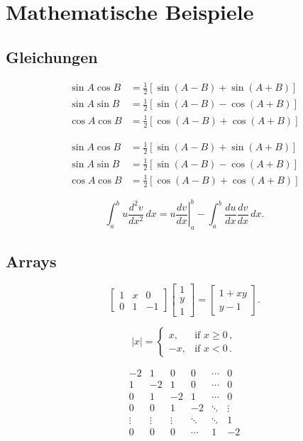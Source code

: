 \chapter{Mathematische Beispiele}
\label{sec:math}


\section{Gleichungen}

\begin{align}
\sin A \cos B &= \frac{1}{2}\left[ \sin(A-B)+\sin(A+B) \right] \\
\sin A \sin B &= \frac{1}{2}\left[ \sin(A-B)-\cos(A+B) \right] \\
\cos A \cos B &= \frac{1}{2}\left[ \cos(A-B)+\cos(A+B) \right] 
\end{align}

\begin{align*}
\sin A \cos B &= \frac{1}{2}\left[ \sin(A-B)+\sin(A+B) \right] \\
\sin A \sin B &= \frac{1}{2}\left[ \sin(A-B)-\cos(A+B) \right] \\
\cos A \cos B &= \frac{1}{2}\left[ \cos(A-B)+\cos(A+B) \right] 
\end{align*}

\[
\int_a^bu\frac{d^2v}{dx^2}\,dx
=\left.u\frac{dv}{dx}\right|_a^b
-\int_a^b\frac{du}{dx}\frac{dv}{dx}\,dx.
\]



\section{Arrays}

\[
\begin{bmatrix}
1 & x & 0 \\
0 & 1 & -1
\end{bmatrix}\begin{bmatrix}
1  \\
y  \\
1
\end{bmatrix}
=\begin{bmatrix}
1+xy  \\
y-1
\end{bmatrix}.
\]


\[
|x|=\begin{cases}
x, & \text{if }x\geq 0\,,  \\
-x, & \text{if }x< 0\,.
\end{cases}
\]


\[
\begin{matrix}
-2 & 1 & 0 & 0 & \cdots & 0  \\
1 & -2 & 1 & 0 & \cdots & 0  \\
0 & 1 & -2 & 1 & \cdots & 0  \\
0 & 0 & 1 & -2 & \ddots & \vdots \\
\vdots & \vdots & \vdots & \ddots & \ddots & 1  \\
0 & 0 & 0 & \cdots & 1 & -2
\end{matrix}
\]





